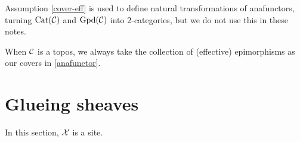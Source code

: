 \begin{appendices}
\begin{definitions}
  \end{definitions}

  \begin{remark}
    Assumption \cref{cover-eff} is used to define natural
    transformations of anafunctors, turning $\operatorname{Cat}(\mathcal{C})$ and $\operatorname{Gpd}(\mathcal{C})$
    into $2$-categories, but we do not use this in these notes.
  \end{remark}

  \begin{convention}
    When $\mathcal{C}$ is a topos, we always take the collection of
    (effective) epimorphisms as our covers in \cref{anafunctor}.
  \end{convention}


  \section{Glueing sheaves}

  \begin{notation}
    In this section, $\mathcal{X}$ is a site.
  \end{notation}


\end{appendices}
